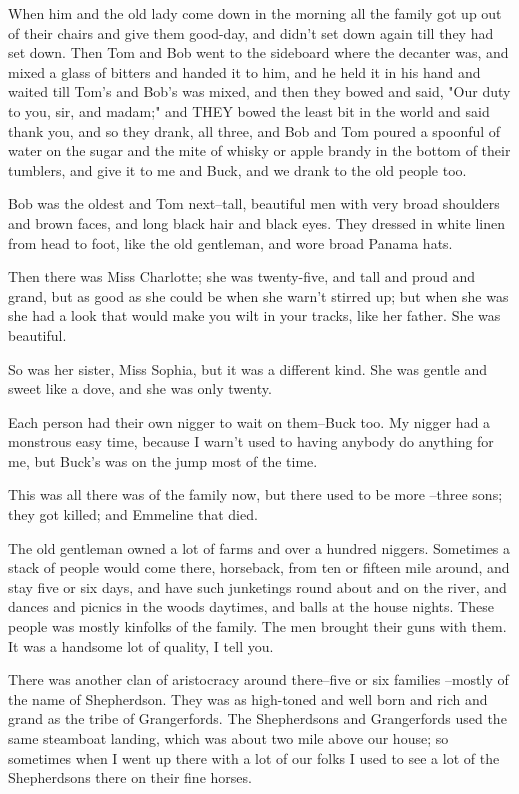 When him and the old lady come down in the morning all the family got up
out of their chairs and give them good-day, and didn't set down again
till they had set down.  Then Tom and Bob went to the sideboard where the
decanter was, and mixed a glass of bitters and handed it to him, and he
held it in his hand and waited till Tom's and Bob's was mixed, and then
they bowed and said, "Our duty to you, sir, and madam;" and THEY bowed
the least bit in the world and said thank you, and so they drank, all
three, and Bob and Tom poured a spoonful of water on the sugar and the
mite of whisky or apple brandy in the bottom of their tumblers, and give
it to me and Buck, and we drank to the old people too.

Bob was the oldest and Tom next--tall, beautiful men with very broad
shoulders and brown faces, and long black hair and black eyes.  They
dressed in white linen from head to foot, like the old gentleman, and
wore broad Panama hats.

Then there was Miss Charlotte; she was twenty-five, and tall and proud
and grand, but as good as she could be when she warn't stirred up; but
when she was she had a look that would make you wilt in your tracks, like
her father.  She was beautiful.

So was her sister, Miss Sophia, but it was a different kind.  She was
gentle and sweet like a dove, and she was only twenty.

Each person had their own nigger to wait on them--Buck too.  My nigger
had a monstrous easy time, because I warn't used to having anybody do
anything for me, but Buck's was on the jump most of the time.

This was all there was of the family now, but there used to be more
--three sons; they got killed; and Emmeline that died.

The old gentleman owned a lot of farms and over a hundred niggers.
Sometimes a stack of people would come there, horseback, from ten or
fifteen mile around, and stay five or six days, and have such junketings
round about and on the river, and dances and picnics in the woods
daytimes, and balls at the house nights.  These people was mostly
kinfolks of the family.  The men brought their guns with them.  It was a
handsome lot of quality, I tell you.

There was another clan of aristocracy around there--five or six families
--mostly of the name of Shepherdson.  They was as high-toned and well
born and rich and grand as the tribe of Grangerfords.  The Shepherdsons
and Grangerfords used the same steamboat landing, which was about two
mile above our house; so sometimes when I went up there with a lot of our
folks I used to see a lot of the Shepherdsons there on their fine horses.

